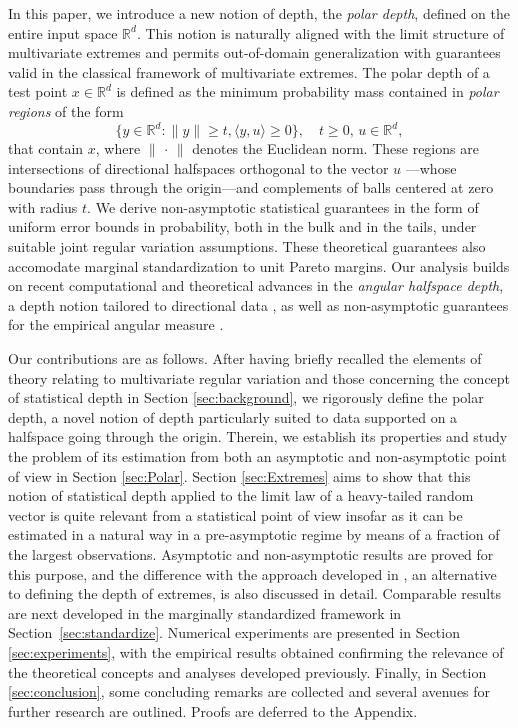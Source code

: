 \documentclass{article}
\numberwithin{equation}{section}
\newcommand{\point}{\,\cdot\,}
\begin{document}
In this paper, we introduce a new notion of depth, the \textit{polar
depth}, defined on the entire input space $\mathbb{R}^d$. This notion
is naturally aligned with the limit structure of multivariate
extremes and permits out-of-domain generalization with guarantees
valid in the classical framework of multivariate extremes. The polar
depth of a test point $x \in \mathbb{R}^d$ is defined as the minimum
probability mass contained in \emph{polar regions} of the form
$$
\{y \in \mathbb{R}^d : \|y\| \geq t, \langle y, u \rangle \geq 0\},
\quad t \geq 0, \, u \in \mathbb{R}^d,
$$
that contain $x$, where $\|\point\|$ denotes the Euclidean norm.
These regions are intersections of directional halfspaces orthogonal
to the vector $u$ ---whose boundaries pass through the origin---and
complements of balls centered at zero with radius $t$.
We derive non-asymptotic statistical guarantees in the form of
uniform error bounds in probability, both in the bulk and in the
tails, under suitable joint regular variation assumptions. These
theoretical guarantees also accomodate  marginal standardization to
unit Pareto margins.
Our analysis builds on recent computational and theoretical advances
in the \emph{angular halfspace depth}, a depth notion tailored to
directional data
\citep{NagyLD21,NagyDemniButtarazziPorzio2023,nagy2024theoretical},
as well as non-asymptotic guarantees for the empirical angular
measure \citep{ClemenconJalalzaiSabourinSegers2023}.
\medskip

Our contributions are as follows. After having briefly recalled the
elements of theory relating to multivariate regular variation and
those concerning the concept of statistical depth in Section
\ref{sec:background}, we rigorously define the polar depth, a
novel notion of depth particularly suited to data supported on a
halfspace going through the origin. Therein, we establish its
properties and study the problem of its estimation from both an
asymptotic and non-asymptotic point of view in Section
\ref{sec:Polar}. Section \ref{sec:Extremes} aims to show that this
notion of statistical depth applied to the limit law of a
heavy-tailed random vector is quite relevant from a statistical point
of view insofar as it can be estimated in a natural way in a
pre-asymptotic regime by means of a fraction of the largest
observations. Asymptotic and non-asymptotic results are proved for
this purpose, and the difference with the approach developed in
\citep{einmahl2015bridging, he2017estimation}, an alternative to
defining the depth of extremes, is also discussed in detail.
Comparable results are next developed in the marginally standardized
framework in Section~\ref{sec:standardize}.
Numerical experiments are presented in Section \ref{sec:experiments},
with the empirical results obtained confirming the relevance of the
theoretical concepts and analyses developed previously. Finally, in
Section \ref{sec:conclusion}, some concluding remarks are collected
and several avenues for further research are outlined. Proofs are deferred to  the Appendix.
\end{document}
